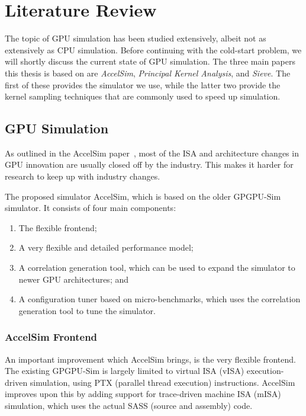 \chapter{Literature Review}\label{ch:literature-review}
The topic of GPU simulation has been studied extensively, albeit not as extensively as CPU simulation.
Before continuing with the cold-start problem, we will shortly discuss the current state of GPU simulation.
The three main papers this thesis is based on are \textit{AccelSim}\cite{accelsim}, \textit{Principal Kernel Analysis}\cite{pks}, and \textit{Sieve}\cite{sieve}.
The first of these provides the simulator we use, while the latter two provide the kernel sampling techniques that are commonly used to speed up simulation.

\section{GPU Simulation}\label{sec:gpu-simulation}
As outlined in the AccelSim paper\ \cite{accelsim}, most of the ISA and architecture changes in GPU innovation are usually closed off by the industry.
This makes it harder for research to keep up with industry changes.

The proposed simulator AccelSim, which is based on the older GPGPU-Sim simulator\cite{gpgpu-sim}.
It consists of four main components:
\begin{enumerate}
    \item The flexible frontend;
    \item A very flexible and detailed performance model;
    \item A correlation generation tool, which can be used to expand the simulator to newer GPU architectures; and
    \item A configuration tuner based on micro-benchmarks, which uses the correlation generation tool to tune the simulator.
\end{enumerate}


\subsection{AccelSim Frontend}\label{subsec:accelsim-frontend}
An important improvement which AccelSim brings, is the very flexible frontend.
The existing GPGPU-Sim is largely limited to virtual ISA (vISA) execution-driven simulation, using PTX (parallel thread execution) instructions.
AccelSim improves upon this by adding support for trace-driven machine ISA (mISA) simulation, which uses the actual SASS (source and assembly) code.

